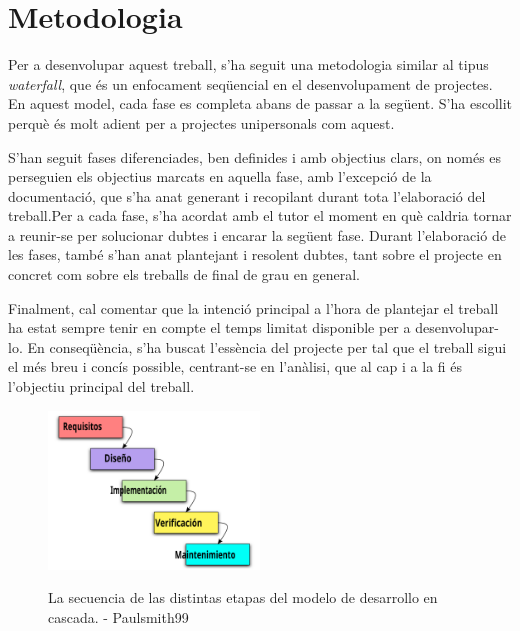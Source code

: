 \chapter{Metodologia}
\label{cap:5}

Per a desenvolupar aquest treball, s'ha seguit una metodologia similar al tipus \textit{waterfall}, que és un enfocament seqüencial en el desenvolupament de projectes. En aquest model, cada fase es completa abans de passar a la següent. S'ha escollit perquè és molt adient per a projectes unipersonals com aquest.

S'han seguit fases diferenciades, ben definides i amb objectius clars, on només es perseguien els objectius marcats en aquella fase, amb l'excepció de la documentació, que s'ha anat generant i recopilant durant tota l'elaboració del treball.Per a cada fase, s'ha acordat amb el tutor el moment en què caldria tornar a reunir-se per solucionar dubtes i encarar la següent fase. Durant l'elaboració de les fases, també s'han anat plantejant i resolent dubtes, tant sobre el projecte en concret com sobre els treballs de final de grau en general.

Finalment, cal comentar que la intenció principal a l'hora de plantejar el treball ha estat sempre tenir en compte el temps limitat disponible per a desenvolupar-lo. En conseqüència, s'ha buscat l'essència del projecte per tal que el treball sigui el més breu i concís possible, centrant-se en l'anàlisi, que al cap i a la fi és l'objectiu principal del treball.


\begin{figure}[!htbp] \includegraphics[width=0.5\textwidth]{Imatges/El_modelo_de_desarrollo_en_cascada.svg.png} \label{fig:Waterfall
} \caption{La secuencia de las distintas etapas del modelo de desarrollo en cascada. - Paulsmith99} \end{figure}
    
